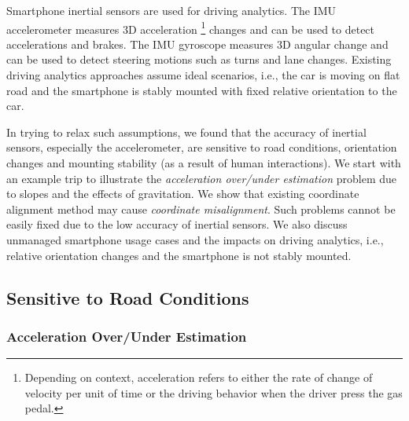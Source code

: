 
Smartphone inertial sensors are used for driving analytics. 
The IMU accelerometer measures 3D acceleration 
\footnote{Depending on context, acceleration refers to either the 
rate of change of velocity per unit of time or the driving behavior
when the driver press the gas pedal.} 
changes and can be used to detect accelerations and brakes. 
The IMU gyroscope measures 3D angular change and can be used
to detect steering motions such as turns and lane changes.
Existing driving analytics approaches \cite{wang2013sensing,hansenspeed,chen2015invisible} 
assume ideal scenarios, i.e., 
the car is moving on flat road and  
the smartphone is stably mounted
with fixed relative orientation to the car. 


In trying to relax such assumptions, 
we found that the accuracy of inertial sensors, 
especially the accelerometer, are sensitive to road conditions, 
orientation changes and mounting stability (as a result of human interactions). 
We start with an example trip to illustrate the 
\emph{acceleration over/under estimation} problem
due to slopes and the effects of gravitation.  
We show that existing coordinate alignment
method may cause \emph{coordinate misalignment}. 
Such problems cannot be easily fixed due to 
the low accuracy of inertial sensors. 
We also discuss unmanaged smartphone usage
cases and the impacts on driving analytics, 
i.e., relative orientation changes and the 
smartphone is not stably mounted. 

\subsection{Sensitive to Road Conditions}

\subsubsection{Acceleration Over/Under Estimation}


